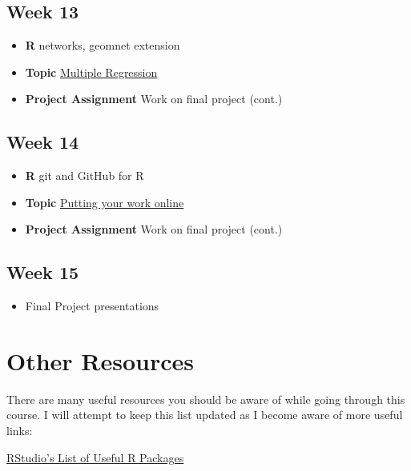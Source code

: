 \documentclass[]{book}
\providecommand{\tightlist}{%
  \setlength{\itemsep}{0pt}\setlength{\parskip}{0pt}}
\theoremstyle{definition}
\theoremstyle{definition}
\theoremstyle{remark}
\begin{document}
\subsection*{Week 13}\label{week-13}

\begin{itemize}
\tightlist
\item
  \textbf{R} networks, geomnet extension 
\item
  \textbf{Topic} \protect\hyperlink{multiple-regression}{Multiple
  Regression}
\item
  \textbf{Project Assignment} Work on final project (cont.)
\end{itemize}

\subsection*{Week 14}\label{week-14}

\begin{itemize}
\tightlist
\item
  \textbf{R} git and GitHub for R
\item
  \textbf{Topic} \href{}{Putting your work online}
\item
  \textbf{Project Assignment} Work on final project (cont.)
\end{itemize}

\subsection*{Week 15}\label{week-15}

\begin{itemize}
\tightlist
\item
  Final Project presentations
\end{itemize}

\section*{Other Resources}\label{other-resources}

There are many useful resources you should be aware of while going
through this course. I will attempt to keep this list updated as I
become aware of more useful links:

\href{https://github.com/rstudio/RStartHere}{RStudio's List of Useful R
Packages}
\end{document}

